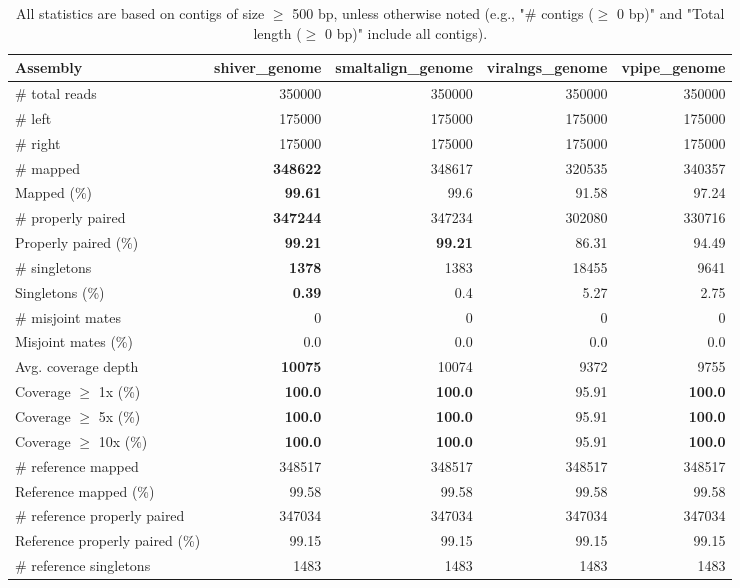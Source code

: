 \documentclass[12pt,a4paper]{article}
\begin{document}
\begin{table}[ht]
\begin{center}
\caption{All statistics are based on contigs of size $\geq$ 500 bp, unless otherwise noted (e.g., "\# contigs ($\geq$ 0 bp)" and "Total length ($\geq$ 0 bp)" include all contigs).}
\begin{tabular}{|l*{4}{|r}|}
\hline
Assembly & shiver\_genome & smaltalign\_genome & viralngs\_genome & vpipe\_genome \\ \hline
\# total reads & 350000 & 350000 & 350000 & 350000 \\ \hline
\# left & 175000 & 175000 & 175000 & 175000 \\ \hline
\# right & 175000 & 175000 & 175000 & 175000 \\ \hline
\# mapped & {\bf 348622} & 348617 & 320535 & 340357 \\ \hline
Mapped (\%) & {\bf 99.61} & 99.6 & 91.58 & 97.24 \\ \hline
\# properly paired & {\bf 347244} & 347234 & 302080 & 330716 \\ \hline
Properly paired (\%) & {\bf 99.21} & {\bf 99.21} & 86.31 & 94.49 \\ \hline
\# singletons & {\bf 1378} & 1383 & 18455 & 9641 \\ \hline
Singletons (\%) & {\bf 0.39} & 0.4 & 5.27 & 2.75 \\ \hline
\# misjoint mates & 0 & 0 & 0 & 0 \\ \hline
Misjoint mates (\%) & 0.0 & 0.0 & 0.0 & 0.0 \\ \hline
Avg. coverage depth & {\bf 10075} & 10074 & 9372 & 9755 \\ \hline
Coverage $\geq$ 1x (\%) & {\bf 100.0} & {\bf 100.0} & 95.91 & {\bf 100.0} \\ \hline
Coverage $\geq$ 5x (\%) & {\bf 100.0} & {\bf 100.0} & 95.91 & {\bf 100.0} \\ \hline
Coverage $\geq$ 10x (\%) & {\bf 100.0} & {\bf 100.0} & 95.91 & {\bf 100.0} \\ \hline
\# reference mapped & 348517 & 348517 & 348517 & 348517 \\ \hline
Reference mapped (\%) & 99.58 & 99.58 & 99.58 & 99.58 \\ \hline
\# reference properly paired & 347034 & 347034 & 347034 & 347034 \\ \hline
Reference properly paired (\%) & 99.15 & 99.15 & 99.15 & 99.15 \\ \hline
\# reference singletons & 1483 & 1483 & 1483 & 1483 \\ \hline

\end{tabular}
\end{center}
\end{table}
\end{document}
